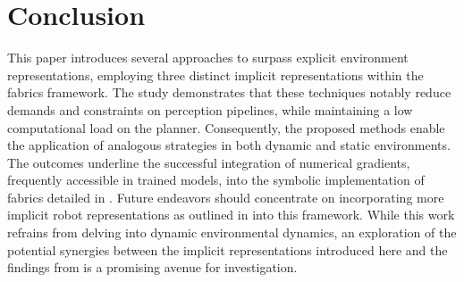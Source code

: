 \section{Conclusion}
\label{sec:conclusion}

This paper introduces several approaches to surpass explicit environment
representations, employing three distinct implicit representations within the
\ac{fabrics} framework. The study demonstrates that these techniques notably
reduce demands and constraints on perception pipelines, while maintaining a low
computational load on the planner. Consequently, the proposed methods enable the
application of analogous strategies in both dynamic and static environments.
The outcomes underline the successful integration of numerical gradients,
frequently accessible in trained models, into the symbolic implementation of
\ac{fabrics} detailed in \cite{Spahn2022}. Future endeavors should concentrate
on incorporating more implicit robot representations as outlined in
\cite{Liu2022regularized,Koptev2023neural} into this framework. While this work refrains from
delving into dynamic environmental dynamics, an exploration of the potential
synergies between the implicit representations introduced here and the findings
from \cite{Spahn2022} is a promising avenue for investigation.
